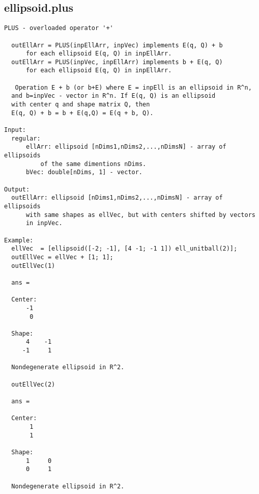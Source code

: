 \subsection{\texorpdfstring{ellipsoid.plus}{plus}}\label{method:ellipsoid.plus}
\begin{verbatim}
PLUS - overloaded operator '+'

  outEllArr = PLUS(inpEllArr, inpVec) implements E(q, Q) + b
      for each ellipsoid E(q, Q) in inpEllArr.
  outEllArr = PLUS(inpVec, inpEllArr) implements b + E(q, Q)
      for each ellipsoid E(q, Q) in inpEllArr.

   Operation E + b (or b+E) where E = inpEll is an ellipsoid in R^n,
  and b=inpVec - vector in R^n. If E(q, Q) is an ellipsoid
  with center q and shape matrix Q, then
  E(q, Q) + b = b + E(q,Q) = E(q + b, Q).

Input:
  regular:
      ellArr: ellipsoid [nDims1,nDims2,...,nDimsN] - array of ellipsoids
          of the same dimentions nDims.
      bVec: double[nDims, 1] - vector.

Output:
  outEllArr: ellipsoid [nDims1,nDims2,...,nDimsN] - array of ellipsoids
      with same shapes as ellVec, but with centers shifted by vectors
      in inpVec.

Example:
  ellVec  = [ellipsoid([-2; -1], [4 -1; -1 1]) ell_unitball(2)];
  outEllVec = ellVec + [1; 1];
  outEllVec(1)

  ans =

  Center:
      -1
       0

  Shape:
      4    -1
     -1     1

  Nondegenerate ellipsoid in R^2.

  outEllVec(2)

  ans =

  Center:
       1
       1

  Shape:
      1     0
      0     1

  Nondegenerate ellipsoid in R^2.
\end{verbatim}
